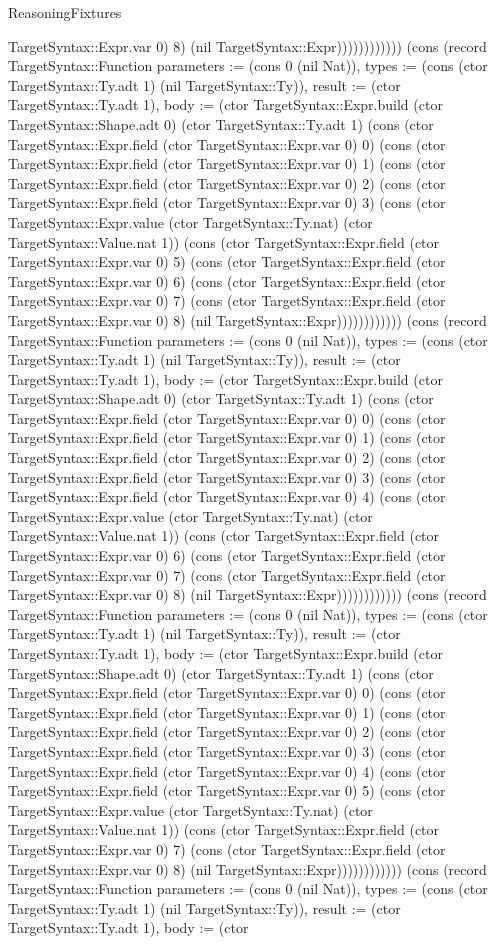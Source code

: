 \begin{lexlean}{ReasoningFixtures}
\begin{semanticmodule}
{TargetSyntax::Expr.var 0) 8) (nil TargetSyntax::Expr)))))))))))}) (cons (record TargetSyntax::Function {parameters := (cons 0 (nil Nat)), types := (cons (ctor TargetSyntax::Ty.adt 1) (nil TargetSyntax::Ty)), result := (ctor TargetSyntax::Ty.adt 1), body := (ctor TargetSyntax::Expr.build (ctor TargetSyntax::Shape.adt 0) (ctor TargetSyntax::Ty.adt 1) (cons (ctor TargetSyntax::Expr.field (ctor TargetSyntax::Expr.var 0) 0) (cons (ctor TargetSyntax::Expr.field (ctor TargetSyntax::Expr.var 0) 1) (cons (ctor TargetSyntax::Expr.field (ctor TargetSyntax::Expr.var 0) 2) (cons (ctor TargetSyntax::Expr.field (ctor TargetSyntax::Expr.var 0) 3) (cons (ctor TargetSyntax::Expr.value (ctor TargetSyntax::Ty.nat) (ctor TargetSyntax::Value.nat 1)) (cons (ctor TargetSyntax::Expr.field (ctor TargetSyntax::Expr.var 0) 5) (cons (ctor TargetSyntax::Expr.field (ctor TargetSyntax::Expr.var 0) 6) (cons (ctor TargetSyntax::Expr.field (ctor TargetSyntax::Expr.var 0) 7) (cons (ctor TargetSyntax::Expr.field (ctor TargetSyntax::Expr.var 0) 8) (nil TargetSyntax::Expr)))))))))))}) (cons (record TargetSyntax::Function {parameters := (cons 0 (nil Nat)), types := (cons (ctor TargetSyntax::Ty.adt 1) (nil TargetSyntax::Ty)), result := (ctor TargetSyntax::Ty.adt 1), body := (ctor TargetSyntax::Expr.build (ctor TargetSyntax::Shape.adt 0) (ctor TargetSyntax::Ty.adt 1) (cons (ctor TargetSyntax::Expr.field (ctor TargetSyntax::Expr.var 0) 0) (cons (ctor TargetSyntax::Expr.field (ctor TargetSyntax::Expr.var 0) 1) (cons (ctor TargetSyntax::Expr.field (ctor TargetSyntax::Expr.var 0) 2) (cons (ctor TargetSyntax::Expr.field (ctor TargetSyntax::Expr.var 0) 3) (cons (ctor TargetSyntax::Expr.field (ctor TargetSyntax::Expr.var 0) 4) (cons (ctor TargetSyntax::Expr.value (ctor TargetSyntax::Ty.nat) (ctor TargetSyntax::Value.nat 1)) (cons (ctor TargetSyntax::Expr.field (ctor TargetSyntax::Expr.var 0) 6) (cons (ctor TargetSyntax::Expr.field (ctor TargetSyntax::Expr.var 0) 7) (cons (ctor TargetSyntax::Expr.field (ctor TargetSyntax::Expr.var 0) 8) (nil TargetSyntax::Expr)))))))))))}) (cons (record TargetSyntax::Function {parameters := (cons 0 (nil Nat)), types := (cons (ctor TargetSyntax::Ty.adt 1) (nil TargetSyntax::Ty)), result := (ctor TargetSyntax::Ty.adt 1), body := (ctor TargetSyntax::Expr.build (ctor TargetSyntax::Shape.adt 0) (ctor TargetSyntax::Ty.adt 1) (cons (ctor TargetSyntax::Expr.field (ctor TargetSyntax::Expr.var 0) 0) (cons (ctor TargetSyntax::Expr.field (ctor TargetSyntax::Expr.var 0) 1) (cons (ctor TargetSyntax::Expr.field (ctor TargetSyntax::Expr.var 0) 2) (cons (ctor TargetSyntax::Expr.field (ctor TargetSyntax::Expr.var 0) 3) (cons (ctor TargetSyntax::Expr.field (ctor TargetSyntax::Expr.var 0) 4) (cons (ctor TargetSyntax::Expr.field (ctor TargetSyntax::Expr.var 0) 5) (cons (ctor TargetSyntax::Expr.value (ctor TargetSyntax::Ty.nat) (ctor TargetSyntax::Value.nat 1)) (cons (ctor TargetSyntax::Expr.field (ctor TargetSyntax::Expr.var 0) 7) (cons (ctor TargetSyntax::Expr.field (ctor TargetSyntax::Expr.var 0) 8) (nil TargetSyntax::Expr)))))))))))}) (cons (record TargetSyntax::Function {parameters := (cons 0 (nil Nat)), types := (cons (ctor TargetSyntax::Ty.adt 1) (nil TargetSyntax::Ty)), result := (ctor TargetSyntax::Ty.adt 1), body := (ctor }
\end{semanticmodule}
\end{lexlean}

